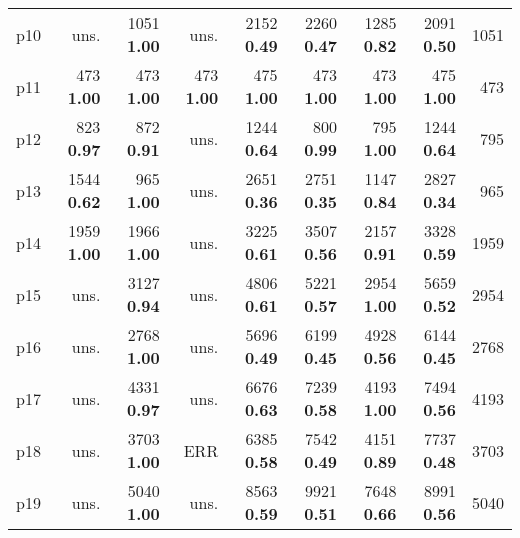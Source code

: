 \begin{tabular}{|l|rrrrrrr|r|}
p10 & uns. & {\footnotesize 1051} \textbf{1.00} & uns. & {\footnotesize 2152} \textbf{0.49} & {\footnotesize 2260} \textbf{0.47} & {\footnotesize 1285} \textbf{0.82} & {\footnotesize 2091} \textbf{0.50} & 1051\\
p11 & {\footnotesize 473} \textbf{1.00} & {\footnotesize 473} \textbf{1.00} & {\footnotesize 473} \textbf{1.00} & {\footnotesize 475} \textbf{1.00} & {\footnotesize 473} \textbf{1.00} & {\footnotesize 473} \textbf{1.00} & {\footnotesize 475} \textbf{1.00} & 473\\
p12 & {\footnotesize 823} \textbf{0.97} & {\footnotesize 872} \textbf{0.91} & uns. & {\footnotesize 1244} \textbf{0.64} & {\footnotesize 800} \textbf{0.99} & {\footnotesize 795} \textbf{1.00} & {\footnotesize 1244} \textbf{0.64} & 795\\
p13 & {\footnotesize 1544} \textbf{0.62} & {\footnotesize 965} \textbf{1.00} & uns. & {\footnotesize 2651} \textbf{0.36} & {\footnotesize 2751} \textbf{0.35} & {\footnotesize 1147} \textbf{0.84} & {\footnotesize 2827} \textbf{0.34} & 965\\
p14 & {\footnotesize 1959} \textbf{1.00} & {\footnotesize 1966} \textbf{1.00} & uns. & {\footnotesize 3225} \textbf{0.61} & {\footnotesize 3507} \textbf{0.56} & {\footnotesize 2157} \textbf{0.91} & {\footnotesize 3328} \textbf{0.59} & 1959\\
p15 & uns. & {\footnotesize 3127} \textbf{0.94} & uns. & {\footnotesize 4806} \textbf{0.61} & {\footnotesize 5221} \textbf{0.57} & {\footnotesize 2954} \textbf{1.00} & {\footnotesize 5659} \textbf{0.52} & 2954\\
p16 & uns. & {\footnotesize 2768} \textbf{1.00} & uns. & {\footnotesize 5696} \textbf{0.49} & {\footnotesize 6199} \textbf{0.45} & {\footnotesize 4928} \textbf{0.56} & {\footnotesize 6144} \textbf{0.45} & 2768\\
p17 & uns. & {\footnotesize 4331} \textbf{0.97} & uns. & {\footnotesize 6676} \textbf{0.63} & {\footnotesize 7239} \textbf{0.58} & {\footnotesize 4193} \textbf{1.00} & {\footnotesize 7494} \textbf{0.56} & 4193\\
p18 & uns. & {\footnotesize 3703} \textbf{1.00} & ERR & {\footnotesize 6385} \textbf{0.58} & {\footnotesize 7542} \textbf{0.49} & {\footnotesize 4151} \textbf{0.89} & {\footnotesize 7737} \textbf{0.48} & 3703\\
p19 & uns. & {\footnotesize 5040} \textbf{1.00} & uns. & {\footnotesize 8563} \textbf{0.59} & {\footnotesize 9921} \textbf{0.51} & {\footnotesize 7648} \textbf{0.66} & {\footnotesize 8991} \textbf{0.56} & 5040\\

\end{tabular}
